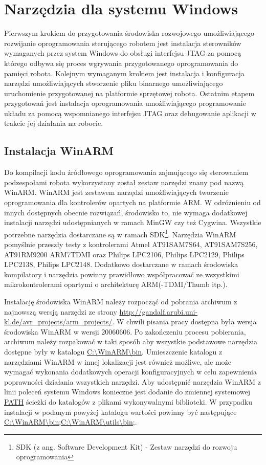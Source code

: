 \section{Narzędzia dla systemu Windows}
Pierwszym krokiem do przygotowania środowiska rozwojowego umożliwiającego
rozwijanie oprogramowania sterującego robotem jest instalacja sterowników
wymaganych przez system Windows do obsługi interfejsu JTAG za pomocą którego
odbywa się proces wgrywania przygotowanego oprogramowania do pamięci robota.
Kolejnym wymaganym krokiem jest instalacja i konfiguracja narzędzi
umożliwiających stworzenie pliku binarnego umożliwiającego uruchomienie
przygotowanej na platformie sprzętowej robota. Ostatnim etapem przygotowań jest
instalacja oprogramowania umożliwiającego programowanie układu za pomocą
wspomnianego interfejsu JTAG oraz debugowanie aplikacji w trakcie jej działania
na robocie.

\subsection{Instalacja WinARM}
Do kompilacji kodu źródłowego oprogramowania zajmującego się sterowaniem
podzespołami robota wykorzystany został zestaw narzędzi znany pod nazwą WinARM.
WinARM jest zestawem narzędzi umożliwiających tworzenie oprogramowania dla
kontrolerów opartych na platformie ARM. W odróżnieniu od innych dostępnych
obecnie rozwiązań, środowisko to, nie wymaga dodatkowej instalacji narzędzi
udostępnianych w ramach MinGW czy też Cygwina. Wszystkie potrzebne narzędzia
dostarczane są w ramach SDK\footnote{SDK (z ang. Software Development Kit) -
Zestaw narzędzi do rozwoju oprogramowania}. Narzędzia WinARM pomyślnie przeszły
testy z kontrolerami Atmel AT91SAM7S64, AT91SAM7S256, AT91RM9200 ARM7TDMI oraz
Philips LPC2106, Philips LPC2129, Philips LPC2138, Philips LPC2148. Dodatkowo
dostarczane w ramach środowiska kompilatory i narzędzia powinny prawidłowo
współpracować ze wszystkimi mikrokontrolerami opartymi o architekturę
ARM(-TDMI/Thumb itp.).

Instalację środowiska WinARM należy rozpocząć od pobrania archiwum z najnowszą
wersją narzędzi ze strony
\url{http://gandalf.arubi.uni-kl.de/avr_projects/arm_projects/}. W chwili pisania
pracy dostępna była wersja środowiska WinARM w wersji 20060606. Po zakończeniu
procesu pobierania, archiwum należy rozpakować w taki sposób aby wszystkie
podstawowe narzędzia dostępne były w katalogu \url{C:\WinARM\bin}. Umieszczenie
katalogu z narzędziami WinARM w innej lokalizacji jest również możliwe, ale może
wymagać wykonania dodatkowych operacji konfiguracyjnych w celu zapewnienia
poprawności działania wszystkich narzędzi. Aby udostępnić narzędzia WinARM z
linii poleceń systemu Windows konieczne jest dodanie do zmiennej systemowej
\url{PATH} ścieżki do katalogów z plikami wykonywalnymi biblioteki. W przypadku
instalacji w podanym powyżej katalogu wartości powinny być następujące
\url{C:\WinARM\bin;C:\WinARM\utils\bin;}.

